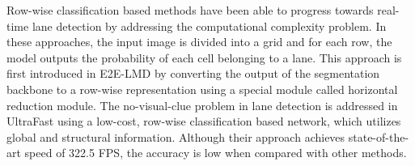\documentclass[conference]{IEEEtran}
\begin{document}
Row-wise classification based methods \cite{yoo2020end, qin2020ultra} have been able to progress towards real-time lane detection by addressing the computational complexity problem. In these approaches, the input image is divided into a grid and for each row, the model outputs the probability of each cell belonging to a lane. This approach is first introduced in E2E-LMD \cite{yoo2020end} by converting the output of the segmentation backbone to a row-wise representation using a special module called horizontal reduction module. The no-visual-clue problem in lane detection is addressed in UltraFast \cite{qin2020ultra} using a low-cost, row-wise classification based network, which utilizes global and structural information. Although their approach achieves state-of-the-art speed of 322.5 FPS, the accuracy is low when compared with other methods.
\end{document}
